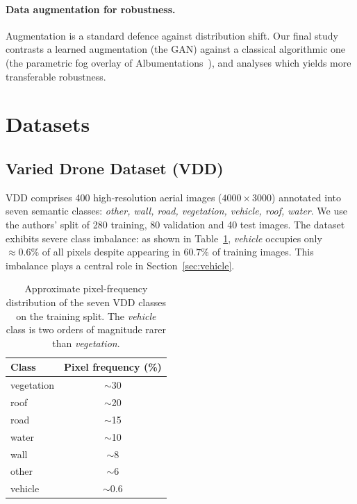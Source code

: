 \documentclass[11pt,a4paper]{article}
\begin{document}
\paragraph{Data augmentation for robustness.}
Augmentation is a standard defence against distribution shift. Our final study
contrasts a learned augmentation (the GAN) against a classical algorithmic one
(the parametric fog overlay of Albumentations~\cite{buslaev2020albumentations}),
and analyses which yields more transferable robustness.

\section{Datasets}

\subsection{Varied Drone Dataset (VDD)}
VDD comprises 400 high-resolution aerial images ($4000\times3000$) annotated
into seven semantic classes: \emph{other, wall, road, vegetation, vehicle,
roof, water}. We use the authors' split of 280 training, 80 validation and 40
test images. The dataset exhibits severe class imbalance: as shown in
Table~\ref{tab:class_dist}, \emph{vehicle} occupies only $\approx 0.6\%$ of all
pixels despite appearing in $60.7\%$ of training images. This imbalance plays a
central role in Section~\ref{sec:vehicle}.

\begin{table}[ht]
\centering
\caption{Approximate pixel-frequency distribution of the seven VDD classes on
the training split. The \emph{vehicle} class is two orders of magnitude rarer
than \emph{vegetation}.}
\label{tab:class_dist}
\begin{tabular}{lc}
\toprule
\textbf{Class} & \textbf{Pixel frequency (\%)} \\
\midrule
vegetation & $\sim$30 \\
roof       & $\sim$20 \\
road       & $\sim$15 \\
water      & $\sim$10 \\
wall       & $\sim$8  \\
other      & $\sim$6  \\
vehicle    & $\sim$0.6 \\
\bottomrule
\end{tabular}
\end{table}
\end{document}
